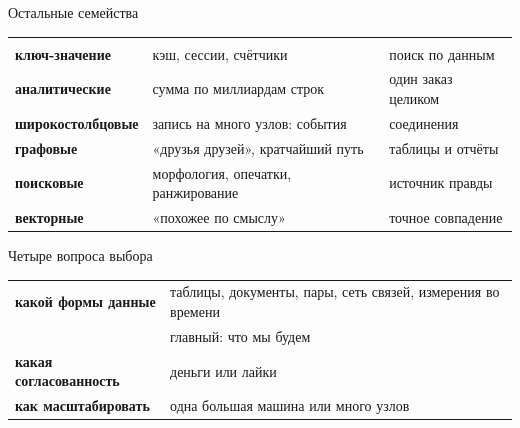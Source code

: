 \documentclass[aspectratio=169,10pt,t]{beamer}
\begin{document}
\begin{frame}{Остальные семейства}
  \slidetop
  {\renewcommand{\arraystretch}{1.5}\small
  \begin{tabular}{@{}L{3.5cm}L{5.6cm}L{3.7cm}@{}}
    &  &  \\
    \textbf{ключ-значение}      & кэш, сессии, счётчики
      & поиск по данным \\
    \textbf{аналитические}      & сумма по миллиардам строк
      & один заказ целиком \\
    \textbf{широкостолбцовые}   & запись на много узлов: события
      & соединения \\
    \textbf{графовые}           & «друзья друзей», кратчайший путь
      & таблицы и отчёты \\
    \textbf{поисковые}          & морфология, опечатки, ранжирование
      & источник правды \\
    \textbf{векторные}          & «похожее по смыслу»
      & точное совпадение \\
  \end{tabular}}

  \slidegap
\end{frame}

\begin{frame}{Четыре вопроса выбора}
  \slidetop

  {\renewcommand{\arraystretch}{1.5}
  \begin{tabular}{@{}L{4.6cm}L{8.2cm}@{}}
    \textbf{какой формы данные}       & таблицы, документы, пары, сеть связей,
      измерения во времени \\
     & главный: что мы будем  \\
    \textbf{какая согласованность}    & деньги или лайки \\
    \textbf{как масштабировать}       & одна большая машина или много узлов \\
  \end{tabular}}
\end{frame}
\end{document}
